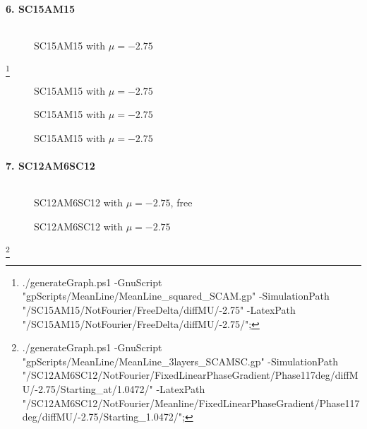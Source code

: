 \documentclass[../main.tex]{subfiles}
\begin{document}
\paragraph{6. SC15AM15}$~$\\
\begin{figure}[H]
    \centering
    
    \caption{SC15AM15 with $\mu = -2.75$}
\end{figure}
\footnote{./generateGraph.ps1 -GnuScript "gpScripts/MeanLine/MeanLine\_squared\_SCAM.gp" -SimulationPath "/SC15AM15/NotFourier/FreeDelta/diffMU/-2.75" -LatexPath "/SC15AM15/NotFourier/FreeDelta/diffMU/-2.75/";}\\
\begin{figure}[H]
    \centering
    
    \caption{SC15AM15 with $\mu = -2.75$}
\end{figure}
\begin{figure}[H]
    \centering
    
    \caption{SC15AM15 with $\mu = -2.75$}
\end{figure}
\begin{figure}[H]
    \centering
    
    \caption{SC15AM15 with $\mu = -2.75$}
\end{figure}



\paragraph{7. SC12AM6SC12}$~$\\
\begin{figure}[H]
    \centering
    
    \caption{SC12AM6SC12 with $\mu = -2.75$, free}
\end{figure}

\begin{figure}[H]
    \centering
    
    \caption{SC12AM6SC12 with $\mu = -2.75$}
\end{figure}
\footnote{./generateGraph.ps1 -GnuScript "gpScripts/MeanLine/MeanLine\_3layers\_SCAMSC.gp" -SimulationPath "/SC12AM6SC12/NotFourier/FixedLinearPhaseGradient/Phase117deg/diffMU/-2.75/Starting\_at/1.0472/" -LatexPath "/SC12AM6SC12/NotFourier/Meanline/FixedLinearPhaseGradient/Phase117deg/diffMU/-2.75/Starting\_1.0472/";
}
\end{document}

